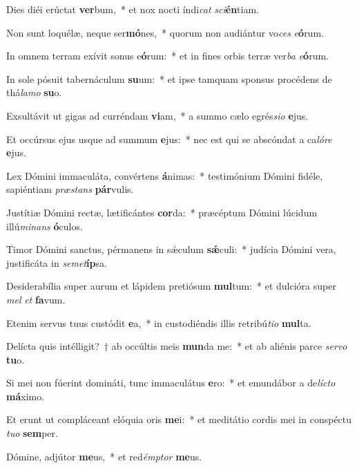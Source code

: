 \item Dies diéi erúctat \textbf{ver}bum,~* et nox nocti índi\textit{cat} \textit{sci}\textbf{én}tiam.
\item Non sunt loquélæ, neque ser\textbf{mó}nes,~* quorum non audiántur vo\textit{ces} \textit{e}\textbf{ó}rum.
\item In omnem terram exívit sonus e\textbf{ó}rum:~* et in fines orbis terræ ver\textit{ba} \textit{e}\textbf{ó}rum.
\item In sole pósuit tabernáculum \textbf{su}um:~* et ipse tamquam sponsus procédens de thá\textit{la}\textit{mo} \textbf{su}o.
\item Exsultávit ut gigas ad curréndam \textbf{vi}am,~* a summo cælo egrés\textit{si}\textit{o} \textbf{e}jus.
\item Et occúrsus ejus usque ad summum \textbf{e}jus:~* nec est qui se abscóndat a ca\textit{ló}\textit{re} \textbf{e}jus.
\item Lex Dómini immaculáta, convértens \textbf{á}nimas:~* testimónium Dómini fidéle, sapiéntiam \textit{præ}\textit{stans} \textbf{pár}vulis.
\item Justítiæ Dómini rectæ, lætificántes \textbf{cor}da:~* præcéptum Dómini lúcidum illú\textit{mi}\textit{nans} \textbf{ó}culos.
\item Timor Dómini sanctus, pérmanens in sǽculum \textbf{sǽ}culi:~* judícia Dómini vera, justificáta in \textit{se}\textit{met}\textbf{íp}sa.
\item Desiderabília super aurum et lápidem pretiósum \textbf{mul}tum:~* et dulcióra super \textit{mel} \textit{et} \textbf{fa}vum.
\item Etenim servus tuus custódit \textbf{e}a,~* in custodiéndis illis retribú\textit{ti}\textit{o} \textbf{mul}ta.
\item Delícta quis intélligit?~† ab occúltis meis \textbf{mun}da me:~* et ab aliénis parce \textit{ser}\textit{vo} \textbf{tu}o.
\item Si mei non fúerint domináti, tunc immaculátus \textbf{e}ro:~* et emundábor a de\textit{líc}\textit{to} \textbf{má}ximo.
\item Et erunt ut compláceant elóquia oris \textbf{me}i:~* et meditátio cordis mei in conspéctu \textit{tu}\textit{o} \textbf{sem}per.
\item Dómine, adjútor \textbf{me}us,~* et red\textit{émp}\textit{tor} \textbf{me}us.
